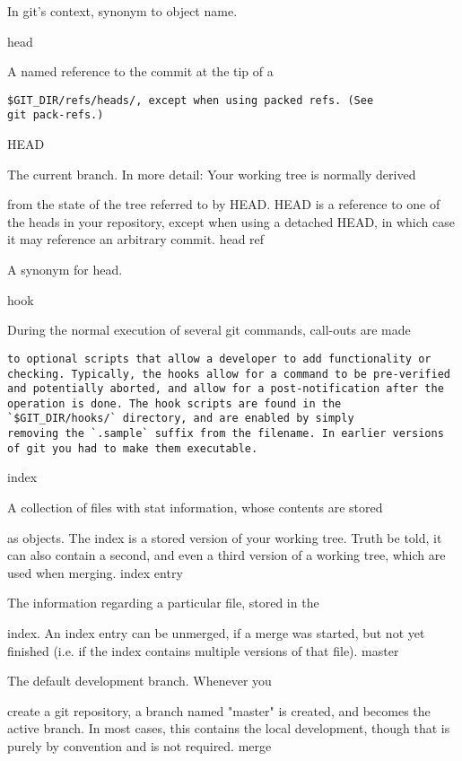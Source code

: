 In git's context, synonym to object name.

head

A named reference to the commit at the tip of a

\scriptsize
\begin{verbatim}
$GIT_DIR/refs/heads/, except when using packed refs. (See
git pack-refs.)
\end{verbatim}
\normalsize

HEAD

The current branch. In more detail: Your working tree is normally derived

from the state of the tree referred to by HEAD.  HEAD is a reference to one
of the heads in your repository, except when using a detached HEAD, in which
case it may reference an arbitrary commit.
head ref

A synonym for head.

hook

During the normal execution of several git commands, call-outs are made
\scriptsize
\begin{verbatim}
to optional scripts that allow a developer to add functionality or
checking. Typically, the hooks allow for a command to be pre-verified
and potentially aborted, and allow for a post-notification after the
operation is done. The hook scripts are found in the
`$GIT_DIR/hooks/` directory, and are enabled by simply
removing the `.sample` suffix from the filename. In earlier versions
of git you had to make them executable.
\end{verbatim}
\normalsize

index

A collection of files with stat information, whose contents are stored

as objects. The index is a stored version of your
working tree. Truth be told, it can also contain a second, and even
a third version of a working tree, which are used
when merging.
index entry

The information regarding a particular file, stored in the

index. An index entry can be unmerged, if a
merge was started, but not yet finished (i.e. if
the index contains multiple versions of that file).
master

The default development branch. Whenever you

create a git repository, a branch named
"master" is created, and becomes the active branch. In most
cases, this contains the local development, though that is
purely by convention and is not required.
merge


